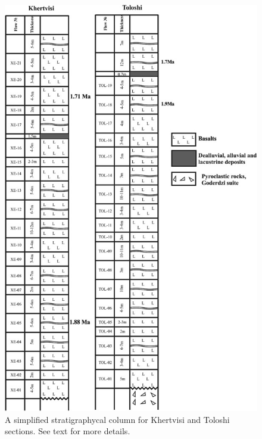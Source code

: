 \documentclass[review]{elsarticle}
\begin{document}
\begin{figure}
    \centering
    \includegraphics{3.jpg}
    \caption{A simplified stratigraphycal column for Khertvisi and Toloshi sections. See text for more details.}
    \label{fig:my_label}
\end{figure}
\begin{table}[h!]
    \centering
    \caption{Isotopic age determinations for two Khertvisi lava flows. Please see text for technical details.}
    \label{tab:my_label}
\end{table}
\end{document}
